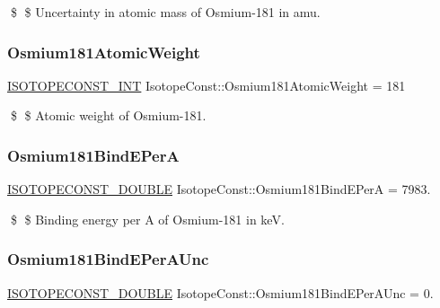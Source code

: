 \$ \$ Uncertainty in atomic mass of Osmium-\/181 in amu. \mbox{\label{group___isotope_const-_osmium-_os181_ga6b059ac36a611ea24eb842796ff33ced}} 
\subsubsection{\texorpdfstring{Osmium181\+Atomic\+Weight}{Osmium181AtomicWeight}}
{\footnotesize\ttfamily \mbox{\hyperlink{group___isotope_const-_macros_ga5f18360b3e99483a35c32d789e62621c}{I\+S\+O\+T\+O\+P\+E\+C\+O\+N\+S\+T\+\_\+\+I\+NT}} Isotope\+Const\+::\+Osmium181\+Atomic\+Weight = 181}

\$ \$ Atomic weight of Osmium-\/181. \mbox{\label{group___isotope_const-_osmium-_os181_ga793df5a3bc6a312de0d7c64b89274571}} 
\subsubsection{\texorpdfstring{Osmium181\+Bind\+E\+PerA}{Osmium181BindEPerA}}
{\footnotesize\ttfamily \mbox{\hyperlink{group___isotope_const-_macros_ga8f45a7272ce02c0b4c65c44636ed719a}{I\+S\+O\+T\+O\+P\+E\+C\+O\+N\+S\+T\+\_\+\+D\+O\+U\+B\+LE}} Isotope\+Const\+::\+Osmium181\+Bind\+E\+PerA = 7983.}

\$ \$ Binding energy per A of Osmium-\/181 in keV. \mbox{\label{group___isotope_const-_osmium-_os181_ga10da7e17c718e98996246ee3c49ec5e4}} 
\subsubsection{\texorpdfstring{Osmium181\+Bind\+E\+Per\+A\+Unc}{Osmium181BindEPerAUnc}}
{\footnotesize\ttfamily \mbox{\hyperlink{group___isotope_const-_macros_ga8f45a7272ce02c0b4c65c44636ed719a}{I\+S\+O\+T\+O\+P\+E\+C\+O\+N\+S\+T\+\_\+\+D\+O\+U\+B\+LE}} Isotope\+Const\+::\+Osmium181\+Bind\+E\+Per\+A\+Unc = 0.}

